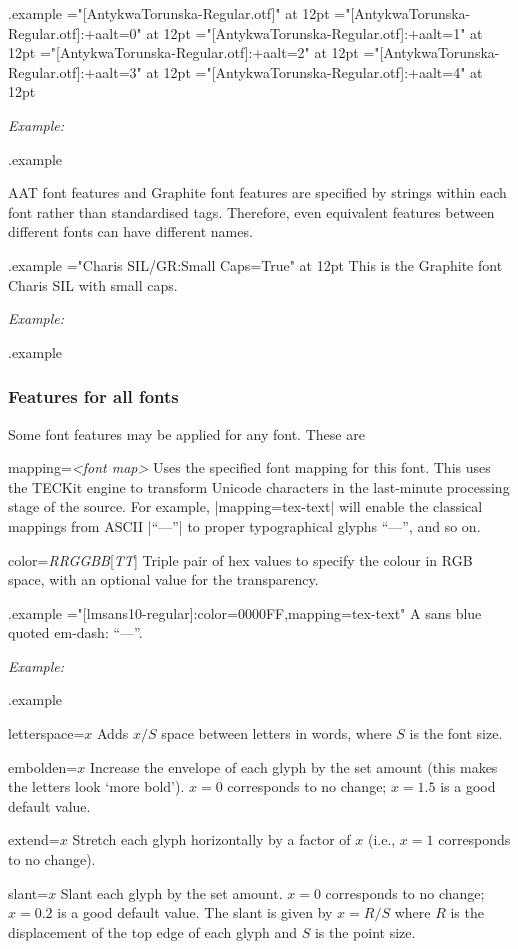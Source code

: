 \documentclass[12pt]{article}
\newenvironment{optdesc}
  {\begin{description}[font=\ttfamily,style=nextline,leftmargin=1.5cm]}
  {\end{description}}
\edef\examplefilename{\jobname.example}
\newlength\exampleindent
\newenvironment{example}
  {\VerbatimEnvironment
   \begin{VerbatimOut}{\examplefilename}}
  {\end{VerbatimOut}
   \typesetexample}
\newcommand\typesetexample{%
  \begin{trivlist}\item[]
  \vrule
  \hspace{\exampleindent}
  \begin{minipage}{\linewidth-\exampleindent-\exampleindent}
    \textit{Example:}\par
    \vspace{0.4\baselineskip}
    \BVerbatimInput[fontsize=\small]{\examplefilename}\par
    \vspace{0.4\baselineskip}
    \color[rgb]{0.7,0,0}\examplefilename\relax
  \end{minipage}\par
  \end{trivlist}}
\begin{document}
\begin{example}
\font\antt="[AntykwaTorunska-Regular.otf]"         at 12pt 
\font\antt="[AntykwaTorunska-Regular.otf]:+aalt=0" at 12pt 
\font\antt="[AntykwaTorunska-Regular.otf]:+aalt=1" at 12pt 
\font\antt="[AntykwaTorunska-Regular.otf]:+aalt=2" at 12pt 
\font\antt="[AntykwaTorunska-Regular.otf]:+aalt=3" at 12pt 
\font\antt="[AntykwaTorunska-Regular.otf]:+aalt=4" at 12pt 
\end{example}

AAT font features and Graphite font features are specified by strings
within each font rather than standardised tags. Therefore, even
equivalent features between different fonts can have different names.

\begin{example}
\font\gra="Charis SIL/GR:Small Caps=True" at 12pt
\gra This is the Graphite font Charis SIL with small caps.
\end{example}

\subsubsection{Features for all fonts}

Some font features may be applied for any font. These are
\begin{optdesc}
\item[mapping=\textsl{<font map>}] 
Uses the specified font mapping for this font. This uses the TECKit
engine to transform Unicode characters in the last-minute processing
stage of the source. For example, |mapping=tex-text| will enable the
classical mappings from ASCII |``---''| to proper typographical
glyphs “—”, and so on.

\item[color={\slshape RRGGBB}{[{\slshape TT}]}] 
Triple pair of hex values to specify the colour in RGB space, with an
optional value for the transparency.

\begin{example}
\font\9="[lmsans10-regular]:color=0000FF,mapping=tex-text"
\9 A sans blue quoted em-dash: ``---''.
\end{example}

\item[letterspace=$x$] 
Adds $x/S$ space between letters in words, where $S$ is the font size.

\item[embolden=$x$]
Increase the envelope of each glyph by the set amount (this makes the
letters look ‘more bold’). $x=0$ corresponds to no change; $x=1.5$ is a
good default value.

\item[extend=$x$]
Stretch each glyph horizontally by a factor of $x$ (i.e., $x=1$
corresponds to no change).

\item[slant=$x$]
Slant each glyph by the set amount. $x=0$ corresponds to no change;
$x=0.2$ is a good default value. The slant is given by $x=R/S$ where $R$
is the displacement of the top edge of each glyph and $S$ is the point
size.

\end{optdesc}
\end{document}
